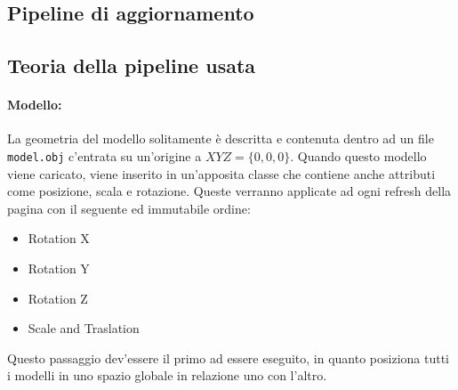 \documentclass{article}
\begin{document}
\hrulefill
\subsection{Pipeline di aggiornamento}

\newpage

\subsection{Teoria della pipeline usata}
\paragraph{Modello:} La geometria del modello solitamente è descritta e contenuta dentro ad un file \texttt{model.obj} c'entrata su un'origine a $XYZ = \{0, 0, 0\}$. Quando questo modello viene caricato, viene inserito in un'apposita classe che contiene anche attributi come posizione, scala e rotazione. Queste verranno applicate ad ogni refresh della pagina con il seguente ed immutabile ordine:
\begin{itemize}
	\item Rotation X
	\item Rotation Y
	\item Rotation Z
	\item Scale and Traslation
\end{itemize}
%
Questo passaggio dev'essere il primo ad essere eseguito, in quanto posiziona tutti i modelli in uno spazio globale in relazione uno con l'altro.
\end{document}
